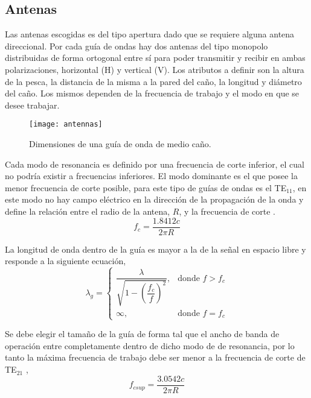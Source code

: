 \subsection{Antenas}

Las antenas escogidas es del tipo apertura dado que se requiere alguna antena direccional. Por cada guía de ondas hay dos antenas del tipo monopolo distribuidas de forma ortogonal entre sí para poder transmitir y recibir en ambas polarizaciones, horizontal (H) y vertical (V). Los atributos a definir son la altura de la pesca, la distancia de la misma a la pared del caño, la longitud y diámetro del caño. Los mismos dependen de la frecuencia de trabajo y el modo en que se desee trabajar.
\begin{figure}
 \centering
 \texttt{[image: antennas]}
 \caption{Dimensiones de una guía de onda de medio caño.}
 \label{fig:antennas}
\end{figure}

Cada modo de resonancia es definido por una frecuencia de corte inferior, el cual no podría existir a frecuencias inferiores. El modo dominante es el que posee la menor frecuencia de corte posible, para este tipo de guías de ondas es el TE$_{11}$, en este modo no hay campo eléctrico en la dirección de la propagación de la onda y define la relación entre el radio de la antena, $R$, y la frecuencia de corte \cite{circularWaveguides}.
\begin{equation} \label{eq:freqInf}
  f_c = \dfrac{1.8412 c}{2\pi R}
\end{equation}

La longitud de onda dentro de la guía es mayor a la de la señal en espacio libre y responde a la siguiente ecuación,
\begin{equation} \label{eq:lambdaInGuide}
\lambda_g = \begin{cases} \dfrac{\lambda}{\sqrt{1 - (\dfrac{f_c}{f})^2}}, & \mbox{donde } f > f_c \\ \infty, & \mbox{donde } f = f_c \end{cases}
\end{equation}


Se debe elegir el tamaño de la guía de forma tal que el ancho de banda de operación entre completamente dentro de dicho modo de de resonancia, por lo tanto la máxima frecuencia de trabajo debe ser menor a la frecuencia de corte de TE$_{21}$ \cite{circularWaveguides},
\begin{equation} \label{eq:freqSup}
  f_{csup} = \dfrac{3.0542 c}{2\pi R}
\end{equation}

